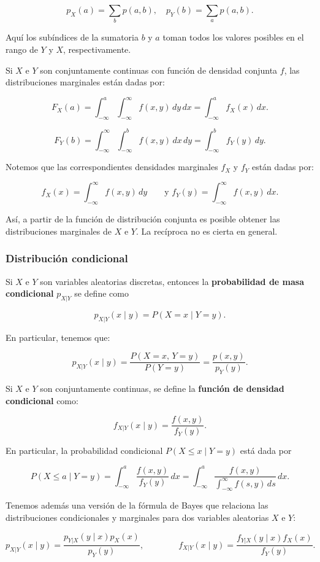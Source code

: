 \documentclass[11pt, a4paper]{article}
\theoremstyle{definition}
\begin{document}
\[p_{X}(a)=\sum_{b}p(a,b), \quad p_{Y}(b)=\sum_{a}p(a,b).\]

Aquí los subíndices de la sumatoria \(b\) y \(a\) toman todos los valores posibles en el rango de \(Y\) y \(X\), respectivamente.

Si \(X\) e \(Y\) son conjuntamente continuas con función de densidad conjunta \(f\), las distribuciones marginales están dadas por:

\[F_{X}(a)=\int_{-\infty}^{a}\int_{-\infty}^{\infty}f(x,y)\,dy\,dx=\int_{-\infty}^ {a}f_{X}(x)\,dx.\]

\[F_{Y}(b)=\int_{-\infty}^{\infty}\int_{-\infty}^{b}f(x,y)\,dx\,dy=\int_{-\infty} ^{b}f_{Y}(y)\,dy.\]

Notemos que las correspondientes densidades marginales \(f_{X}\) y \(f_{Y}\) están dadas por:

\[f_{X}(x)=\int_{-\infty}^{\infty}f(x,y)\,dy\qquad\text{y }f_{Y}(y)=\int_{-\infty}^ {\infty}f(x,y)\,dx.\]

Así, a partir de la función de distribución conjunta es posible obtener las distribuciones marginales de \(X\) e \(Y\). La recíproca no es cierta en general.

\subsubsection{Distribución condicional}
Si \(X\) e \(Y\) son variables aleatorias discretas, entonces la \textbf{probabilidad de masa condicional} \(p_{X|Y}\) se define como

\[p_{X|Y}(x\mid y)=P(X=x\mid Y=y).\]

En particular, tenemos que:

\[p_{X|Y}(x\mid y)=\frac{P(X=x,\,Y=y)}{P(Y=y)}=\frac{p(x,y)}{p_{Y}(y)}.\]

Si \(X\) e \(Y\) son conjuntamente continuas, se define la \textbf{función de densidad condicional} como:

\[f_{X|Y}(x\mid y)=\frac{f(x,y)}{f_{Y}(y)}.\]

En particular, la probabilidad condicional \(P(X\leq x\mid Y=y)\) está dada por

\[P(X\leq a\mid Y=y)=\int_{-\infty}^{a}\frac{f(x,y)}{f_{Y}(y)}\,dx=\int_{-\infty}^{a}\frac{f(x,y)}{\int_{-\infty}^{\infty}f(s,y)\,ds}\,dx.\]

Tenemos además una versión de la fórmula de Bayes que relaciona las distribuciones condicionales y marginales para dos variables aleatorias \(X\) e \(Y\):

\[p_{X|Y}(x\mid y)=\frac{p_{Y|X}(y\mid x)p_{X}(x)}{p_{Y}(y)},\qquad\qquad f_{X|Y}(x\mid y)=\frac{f_{Y|X}(y\mid x)f_{X}(x)}{f_{Y}(y)}.\]
\end{document}
